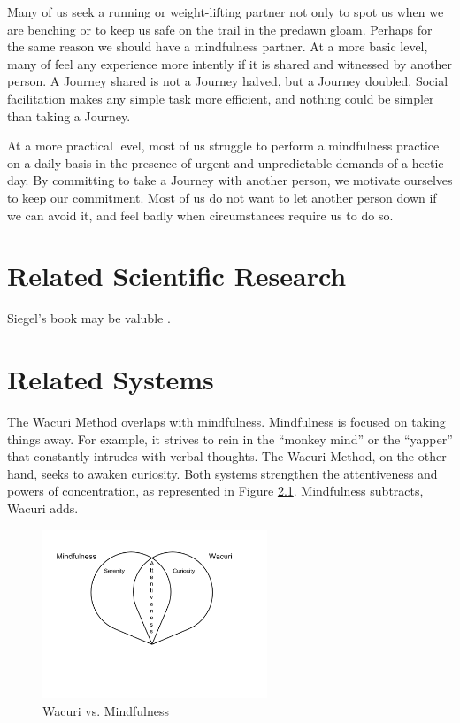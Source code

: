 \documentclass[12pt]{book}
\begin{document}
Many of us seek a running or weight-lifting partner not only to spot
us when we are benching or to keep us safe on the trail in the
predawn gloam.  Perhaps for the same reason we should have a
mindfulness partner.  At a more basic level, many of feel any
experience more intently if it is shared and witnessed by another
person. A Journey shared is not a Journey halved, but a Journey
doubled.  Social facilitation makes any simple task more efficient, and
nothing could be simpler than taking a Journey.

At a more practical level, most of us struggle to perform a
mindfulness practice on a daily basis in the presence of urgent and
unpredictable demands of a hectic day.  By committing to take a Journey
with another person, we motivate ourselves to keep our commitment. Most
of us do not want to let another person down if we can avoid it, and
feel badly when circumstances require us to do so.

\chapter{Related Scientific Research}

Siegel's book may be valuble \cite{siegel2007mindful}.


\chapter{Related Systems}

The Wacuri Method overlaps with mindfulness.  Mindfulness is focused
on taking things away. For example, it strives to rein in the
``monkey mind'' or the ``yapper'' that constantly intrudes with
verbal thoughts. The Wacuri Method, on the other hand, seeks
to awaken curiosity. Both systems strengthen the attentiveness
and powers of concentration, as represented in Figure \ref{fig:wacurivsmindfulness}. Mindfulness subtracts, Wacuri adds.

\begin{figure}
  \centering
     \includegraphics[width=0.6\textwidth]{WacuriFigures/WacuriMindfulnessDiagram.png}
     \caption{Wacuri vs. Mindfulness}
  \label{fig:wacurivsmindfulness}     
\end{figure}
\end{document}
